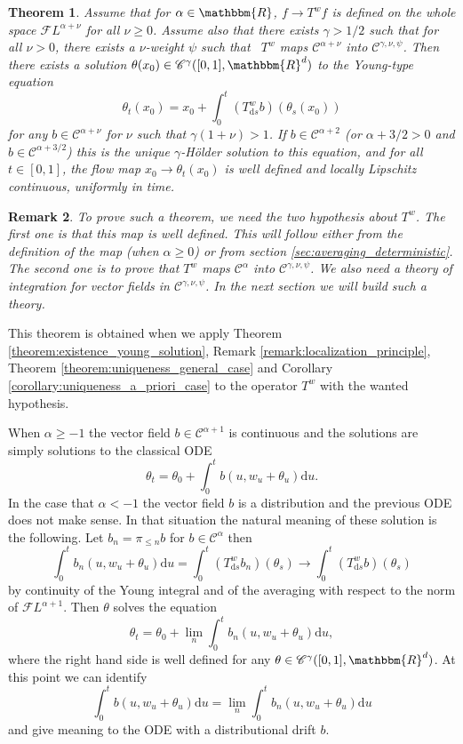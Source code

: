 \documentclass[a4paper,11pt]{article}
\newcommand{\mathd}{\mathrm{d}}
\newtheorem{theorem}{Theorem}[section]
\newtheorem{remark}[theorem]{Remark}
\newcommand{\CC}{\mathscr C}
\newcommand{\CF}{\mathscr F}
\begin{document}
\begin{theorem}
  Assume that for $\alpha \in \mathbbm{R}$, $f \to T^{w} f$ is defined on the
  whole space $\CF L^{\alpha + \nu}$ for all $\nu \geqslant 0$. Assume also
  that there exists $\gamma >1/2$ such that for all $\nu >0$, there exists a
  $\nu$-weight $\psi$ such that \ $T^{w}$ maps $\CC^{\alpha + \nu}$ into
  $\CC^{\gamma , \nu , \psi}$. Then there exists a solution $\theta (x_{0} )
  \in \CC^{\gamma} ([0,1],\mathbbm{R}^{d} )$ to the Young-type equation
  \[ \theta_{t} (x_{0} ) =x_{0} + \int_{0}^{t} (T^{w}_{\mathd s} b) (
     \theta_{s} (x_{0} )) \]
  for any $b \in \CC^{\alpha + \nu}$ for $\nu$ such that $\gamma ( 1+ \nu )
  >1$. If $b \in \CC^{\alpha +2}$ (or $\alpha +3/2>0$ and $b \in \CC^{\alpha
  +3/2}$) this is the unique $\gamma$-Hölder solution to this equation, and
  for all $t \in [0,1]$, the flow map $x_{0} \to \theta_{t} (x_{0} )$ is well
  defined and locally Lipschitz continuous, uniformly in time.
\end{theorem}

\begin{remark}
  To prove such a theorem, we need the two hypothesis about $T^{w}$. The first
  one is that this map is well defined. This will follow either from
  the definition of the map (when $\alpha \ge 0$) or from section
  \ref{sec:averaging_deterministic}. The second one is to prove that $T^{w}$ maps
  $\CC^{\alpha}$ into $\CC^{\gamma , \nu , \psi}$. We also need a theory of
  integration for vector fields in $\CC^{\gamma , \nu , \psi}$. In the next
  section we will build such a theory.
\end{remark}

This theorem is obtained when we apply Theorem \ref{theorem:existence_young_solution}, Remark \ref{remark:localization_principle}, Theorem \ref{theorem:uniqueness_general_case} and Corollary \ref{corollary:uniqueness_a_priori_case} to the operator $T^w$ with the wanted hypothesis.

When $\alpha \geqslant -1$ the vector field $b \in \CC^{\alpha +1}$ is
continuous and the solutions are simply solutions to the classical ODE
\[ \theta_{t} = \theta_{0} + \int_{0}^{t} b (u,w_{u} + \theta_{u} ) \mathd u.
\]
In the case that $\alpha <-1$ the vector field $b$ is a distribution and the
previous ODE does not make sense. In that situation the natural meaning of
these solution is the following. Let $b_{n} = \pi_{\leqslant n} b$ for $b \in
\CC^{\alpha}$ then
\[ \int_{0}^{t} b_{n}  (u,w_{u} + \theta_{u} ) \mathd u= \int_{0}^{t}
   (T^{w}_{\mathd s} b_{n} ) ( \theta_{s} ) \to \int_{0}^{t} (T^{w}_{\mathd s}
   b) ( \theta_{s} ) \]
by continuity of the Young integral and of the averaging with respect to the
norm of $\CF L^{\alpha +1}$. Then $\theta$ solves the equation
\[ \theta_{t} = \theta_{0} + \lim_{n}   \int_{0}^{t} b_{n}  (u,w_{u} +
   \theta_{u} ) \mathd u ,\]
where the right hand side is well defined for any $\theta \in \CC^{\gamma}
([0,1],\mathbbm{R}^{d} )$. At this point we can identify
\[ \int_{0}^{t} b (u,w_{u} + \theta_{u} ) \mathd u= \lim_{n}   \int_{0}^{t}
   b_{n}  (u,w_{u} + \theta_{u} ) \mathd u \]
and give meaning to the ODE with a distributional drift $b$.
\end{document}
